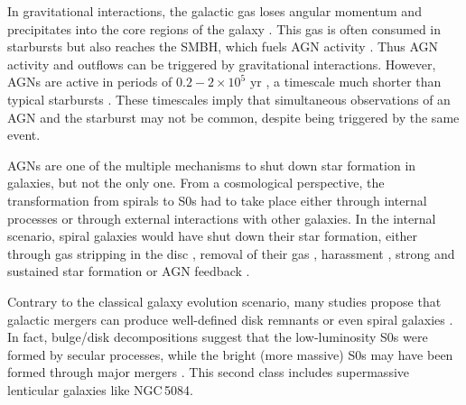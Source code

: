 \documentclass[modern]{CORE-AAS/aastex631}
\begin{document}
{In gravitational interactions, the galactic gas loses angular momentum and precipitates into the core regions of the galaxy \citep{hopkins+2009apj691_1168}. This gas is often consumed in starbursts but also reaches the SMBH, which fuels AGN activity \citep{dimatteo+2005nat433_604, springel+2005mnras361_776}. Thus AGN activity and outflows can be triggered by gravitational interactions. However, AGNs are active in periods of $0.2-2\times10^{5}$ yr \citep{keel+2012mnras420_878}, a timescale much shorter than typical starbursts \citep[$\tau=10^{7}$ yr,][]{heckman+1993inproceedings_455}. These timescales imply that simultaneous observations of an AGN and the starburst may not be common, despite being triggered by the same event. 

AGNs are one of the multiple mechanisms to shut down star formation in galaxies, but not the only one. From a cosmological perspective, the transformation from spirals to S0s had to take place either through internal processes or through external interactions with other galaxies. In the internal scenario, spiral galaxies would have shut down their star formation, either through gas stripping in the disc \citep{laurikainen+2010mnras405_1089}, removal of their gas \citep[starvation or strangulation,][]{larson+1980apj237_692}, harassment \citep{moore+1996nat379_613}, strong and sustained star formation \citep{kormendy+2004araa42_603} or AGN feedback \citep{chen+2020apj897_102}. \par 

Contrary to the classical galaxy evolution scenario, many studies propose that galactic mergers can produce well-defined disk remnants \citep{hopkins+2013mnras430_1901,elichemoral+2018aap617_113} or even spiral galaxies \citep{athanassoula+2016apj821_90,peschken+2017mnras468_994}. In fact, bulge/disk decompositions suggest that the low-luminosity S0s were formed by secular processes, while the bright (more massive) S0s may have been formed through major mergers \citep{barway+2009mnras394_1991,frasermckelvie+2018mnras481_5580}. This second class includes supermassive lenticular galaxies like NGC\,5084.\par 


}
\end{document}
